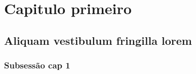 \chapter{Capitulo primeiro}
\lipsum[2]
\section{Aliquam vestibulum fringilla lorem}

\lipsum[2]
\subsection{Subsessão cap 1}
\lipsum[2]